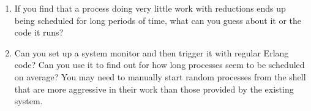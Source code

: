 \begin{enumerate}
	\item If you find that a process doing very little work with reductions ends up being scheduled for long periods of time, what can you guess about it or the code it runs?
	\item Can you set up a system monitor and then trigger it with regular Erlang code? Can you use it to find out for how long processes seem to be scheduled on average? You may need to manually start random processes from the shell that are more aggressive in their work than those provided by the existing system.
\end{enumerate}


